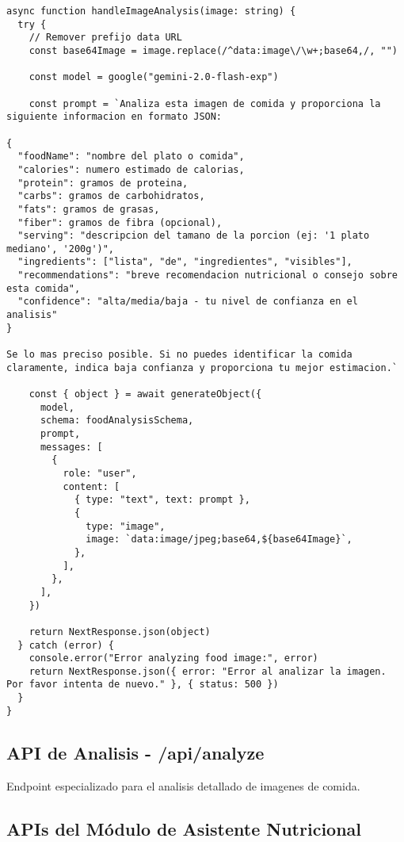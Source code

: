 \documentclass[12pt,a4paper]{article}
\begin{document}
\begin{lstlisting}[caption=Funcion handleImageAnalysis - Analisis con IA]
async function handleImageAnalysis(image: string) {
  try {
    // Remover prefijo data URL
    const base64Image = image.replace(/^data:image\/\w+;base64,/, "")

    const model = google("gemini-2.0-flash-exp")

    const prompt = `Analiza esta imagen de comida y proporciona la siguiente informacion en formato JSON:

{
  "foodName": "nombre del plato o comida",
  "calories": numero estimado de calorias,
  "protein": gramos de proteina,
  "carbs": gramos de carbohidratos,
  "fats": gramos de grasas,
  "fiber": gramos de fibra (opcional),
  "serving": "descripcion del tamano de la porcion (ej: '1 plato mediano', '200g')",
  "ingredients": ["lista", "de", "ingredientes", "visibles"],
  "recommendations": "breve recomendacion nutricional o consejo sobre esta comida",
  "confidence": "alta/media/baja - tu nivel de confianza en el analisis"
}

Se lo mas preciso posible. Si no puedes identificar la comida claramente, indica baja confianza y proporciona tu mejor estimacion.`

    const { object } = await generateObject({
      model,
      schema: foodAnalysisSchema,
      prompt,
      messages: [
        {
          role: "user",
          content: [
            { type: "text", text: prompt },
            {
              type: "image",
              image: `data:image/jpeg;base64,${base64Image}`,
            },
          ],
        },
      ],
    })

    return NextResponse.json(object)
  } catch (error) {
    console.error("Error analyzing food image:", error)
    return NextResponse.json({ error: "Error al analizar la imagen. Por favor intenta de nuevo." }, { status: 500 })
  }
}
\end{lstlisting}
\subsection{API de Analisis - /api/analyze}

Endpoint especializado para el analisis detallado de imagenes de comida.

\subsection{APIs del Módulo de Asistente Nutricional}
\end{document}
